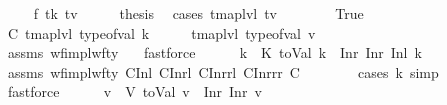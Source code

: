 \begin{isabellebody}
\isanewline
{}\isamarkupfalse%
\isanewline
\ \ \isamarkupfalse%
\ {\isacharparenleft}{\kern0pt}{}\ f\ tk\ tv{\isacharparenright}{\kern0pt}\isanewline
\ \ \isamarkupfalse%
\ \isamarkupfalse%
\ {\isacharquery}{\kern0pt}thesis\ \isamarkupfalse%
\ {\isacharparenleft}{\kern0pt}cases\ {\isachardoublequoteopen}{\isacharparenleft}{\kern0pt}tmap{\isacharunderscore}{\kern0pt}lvl\ tv\ {\isasymle}\ {}{\isacharparenright}{\kern0pt}{\isachardoublequoteclose}{\isacharparenright}{\kern0pt}\isanewline
\ \ \ \ \isamarkupfalse%
\ True\isanewline
\ \ \ \ \isamarkupfalse%
\ \isamarkupfalse%
\ C{\isacharcolon}{\kern0pt}\ {\isachardoublequoteopen}tmap{\isacharunderscore}{\kern0pt}lvl\ {\isacharparenleft}{\kern0pt}type{\isacharunderscore}{\kern0pt}of{\isacharunderscore}{\kern0pt}val\ k{\isacharparenright}{\kern0pt}\ {\isacharequal}{\kern0pt}\ {}\ \ {\isasymand}\ \ tmap{\isacharunderscore}{\kern0pt}lvl\ {\isacharparenleft}{\kern0pt}type{\isacharunderscore}{\kern0pt}of{\isacharunderscore}{\kern0pt}val\ v{\isacharparenright}{\kern0pt}\ {\isasymle}\ {}{\isachardoublequoteclose}\isanewline
\ \ \ \ \ \ \isamarkupfalse%
\ assms\ wf{\isacharunderscore}{\kern0pt}impl{\isacharunderscore}{\kern0pt}wf{\isacharunderscore}{\kern0pt}ty\ {\isachardoublequoteopen}{}{\isachardoublequoteclose}\ \isamarkupfalse%
\ fastforce\isanewline
\ \ \ \ \isamarkupfalse%
\ k{\isacharprime}{\kern0pt}\ \ K{\isacharcolon}{\kern0pt}\ {\isachardoublequoteopen}toVal{}{}{}{}\ k\ {\isacharequal}{\kern0pt}\ Inr\ {\isacharparenleft}{\kern0pt}Inr\ {\isacharparenleft}{\kern0pt}Inl\ k{\isacharprime}{\kern0pt}{\isacharparenright}{\kern0pt}{\isacharparenright}{\kern0pt}{\isachardoublequoteclose}\isanewline
\ \ \ \ \ \ \isamarkupfalse%
\ assms\ wf{\isacharunderscore}{\kern0pt}impl{\isacharunderscore}{\kern0pt}wf{\isacharunderscore}{\kern0pt}ty\ C{}Inl\ C{}Inrl\ C{}Inrrl\ C{}Inrrr\ C\isanewline
\ \ \ \ \ \ \isamarkupfalse%
\ {\isacharparenleft}{\kern0pt}cases\ k{\isacharsemicolon}{\kern0pt}\ simp{\isacharparenright}{\kern0pt}\ \isamarkupfalse%
\ fastforce\isanewline
\ \ \ \ \isamarkupfalse%
\ v{\isacharprime}{\kern0pt}\ \ V{\isacharcolon}{\kern0pt}\ {\isachardoublequoteopen}toVal{}{}{}{}\ v\ {\isacharequal}{\kern0pt}\ Inr\ {\isacharparenleft}{\kern0pt}Inr\ v{\isacharprime}{\kern0pt}{\isacharparenright}{\kern0pt}{\isachardoublequoteclose}\isanewline

\end{isabellebody}
